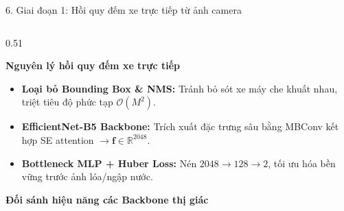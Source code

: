 \documentclass[aspectratio=169,10pt]{beamer}
\begin{document}
\begin{frame}{6. Giai đoạn 1: Hồi quy đếm xe trực tiếp từ ảnh camera}
  \begin{columns}[T]
    \begin{column}{0.51\textwidth}
      \begin{block}{\textbf{Nguyên lý hồi quy đếm xe trực tiếp}}
        \scriptsize
        \begin{itemize}
          \item \textbf{Loại bỏ Bounding Box \& NMS:} Tránh bỏ sót xe máy che khuất nhau, triệt tiêu độ phức tạp $\mathcal{O}(M^2)$.
          \item \textbf{EfficientNet-B5 Backbone:} Trích xuất đặc trưng sâu bằng MBConv kết hợp SE attention $\to \mathbf{f} \in \mathbb{R}^{2048}$.
          \item \textbf{Bottleneck MLP + Huber Loss:} Nén $2048 \to 128 \to 2$, tối ưu hóa bền vững trước ảnh lóa/ngập nước.
        \end{itemize}
      \end{block}
      \vskip 1pt
      \begin{block}{\textbf{Đối sánh hiệu năng các Backbone thị giác}}
        \centering
      \end{block}
    \end{column}


\end{columns}
\end{frame}
\end{document}
